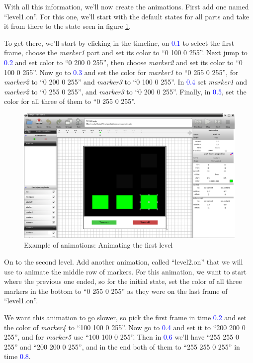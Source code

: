 \documentclass[a4paper]{profusion}
\newcommand{\GUIIcon}[1]{\textcolor{blue}{#1}}    %
\begin{document}
With all this information, we'll now create the animations. First add
one named ``level1.on''. For this one, we'll start with the default
states for all parts and take it from there to the state seen in
figure \ref{fig:anim1_level1}.

To get there, we'll start by clicking in the timeline, on
\GUIIcon{0.1} to select the first frame, choose the \emph{marker1}
part and set its color to ``0 100 0 255''. Next jump to \GUIIcon{0.2}
and set color to ``0 200 0 255'', then choose \emph{marker2} and set
its color to ``0 100 0 255''. Now go to \GUIIcon{0.3} and set the
color for \emph{marker1} to ``0 255 0 255'', for \emph{marker2} to ``0
200 0 255'' and \emph{marker3} to ``0 100 0 255''.  In \GUIIcon{0.4}
set \emph{marker1} and \emph{marker2} to ``0 255 0 255'', and
\emph{marker3} to ``0 200 0 255''. Finally, in \GUIIcon{0.5}, set the
color for all three of them to ``0 255 0 255''.

\begin{figure}[h!]
  \centering
  \includegraphics[width=1.0\textwidth]{examples/anim1_level1.png}
  \caption{Example of animations: Animating the first level}
  \label{fig:anim1_level1}
\end{figure}

On to the second level. Add another animation, called ``level2.on''
that we will use to animate the middle row of markers. For this
animation, we want to start where the previous one ended, so for the
initial state, set the color of all three markers in the bottom to ``0
255 0 255'' as they were on the last frame of ``level1.on''.

We want this animation to go slower, so pick the first frame in time
\GUIIcon{0.2} and set the color of \emph{marker4} to ``100 100 0 255''.
Now go to \GUIIcon{0.4} and set it to ``200 200 0 255'', and for
\emph{marker5} use ``100 100 0 255''. Then in \GUIIcon{0.6} we'll have
``255 255 0 255'' and ``200 200 0 255'', and in the end both of them
to ``255 255 0 255'' in time \GUIIcon{0.8}.
\end{document}
